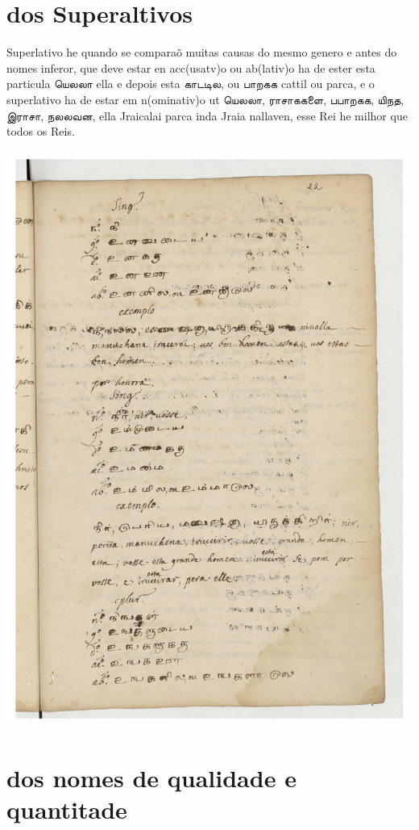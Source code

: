 \documentclass[12pt,a4paper]{scrbook}
\begin{document}
      \chapter*{dos Superaltivos}
    
      

Superlativo he quando se comparaõ muitas causas do mesmo genero e antes do nomes 	
inferor, que deve estar en acc(usatv)o ou ab(lativ)o ha de ester esta particula 	
யெலலா	ella e depois esta காடடில, ou பாறகக cattil ou parca, e o superlativo ha de 
estar em n(ominativ)o ut யெலலா, ராசாககளை, பபாறகக, யிநத, இராசா, நலலவன, ella 	
Jraicalai parca inda Jraia nallaven, esse Rei he milhor que todos os Reis.
		
      
\newpage
\hypertarget{img-53}{
    \includegraphics[width=\textwidth]{img-53}}
\newpage
      \chapter*{dos nomes de qualidade e quantitade}
    
\end{document}
